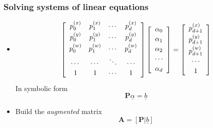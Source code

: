 \documentclass{beamer}
\begin{document}
\begin{frame}
\frametitle{Solving systems of linear equations}
\begin{itemize}[<+->]
\item	\begin{equation*}
		\left[ \begin{array}{c c c c}
			\vspace{2pt}p_0^{(x)}&p_1^{(x)}&\cdots&p_d^{(x)}\\
			\vspace{2pt}p_0^{(y)}&p_1^{(y)}&\cdots&p_d^{(y)}\\
			\vspace{2pt}p_0^{(w)}&p_1^{(w)}&\cdots&p_d^{(w)}\\
			\vspace{2pt}\cdots&\cdots&\ddots&\cdots\\
			\vspace{2pt}1&1&\cdots&1
		\end{array}\right]
		\left[ \begin{array}{c}
			\vspace{2pt}\alpha_0\\
			\vspace{2pt}\alpha_1\\
			\vspace{2pt}\alpha_2\\
			\vspace{2pt}\cdots\\
			\vspace{2pt}\alpha_d
		\end{array}\right]
		=
		\left[ \begin{array}{c}
			\vspace{2pt}p_{{d+1}}^{(x)}\\
			\vspace{2pt}p_{{d+1}}^{(y)}\\
			\vspace{2pt}p_{{d+1}}^{(w)}\\
			\vspace{2pt}\cdots\\
			\vspace{2pt}1
		\end{array}\right]	
		\end{equation*}
		In symbolic form
		\begin{equation*}
		\mathbf{P}\underline{\alpha}=\underline{b}
		\end{equation*}
\item 	Build the \emph{augmented} matrix
		\begin{equation*}
		\mathbf{A}=\left[ \mathbf{P}|\underline{b}\right] 
		\end{equation*}
\end{itemize}
\end{frame}
\end{document}
